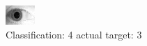 \begin{figure}[h!]
\begin{center}
\includegraphics[width=0.60\columnwidth]{figures/ID1931_class_4_target_3.png}
\end{center}
\caption{ Classification: 4 actual target: 3}
\label{fig:ID1931_class_4_target_3}
\end{figure}
